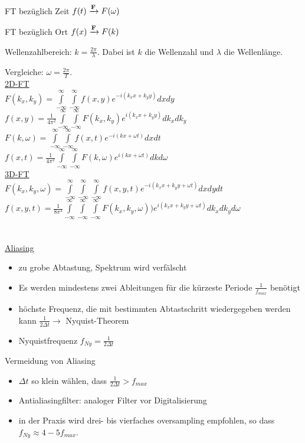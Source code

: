 FT bezüglich Zeit $f(t) \xrightarrow {\bf F} F(\omega)$

FT bezüglich Ort $f(x) \xrightarrow {\bf F} F(k)$

Wellenzahlbereich: $k=\frac{2\pi}{\lambda}$. Dabei ist $k$ die Wellenzahl und $\lambda$ die Wellenlänge. 

Vergleiche: $ \omega =\frac{2\pi}{T}$.
\\
\underline{2D-FT}\\
\hspace*{1cm}$F(k_x,k_y)=\int\limits_{-\infty}^\infty \int\limits_{-\infty}^\infty f(x,y)e^{-i(k_xx+k_yy)} dx dy$\\
\hspace*{1cm} $f(x,y)=\frac{1}{4\pi^2}\int\limits_{-\infty}^\infty \int\limits_{-\infty}^\infty F(k_x,k_y)e^{i(k_xx+k_yy)} dk_x dk_y$\\
\hspace*{1cm} $F(k,\omega)=\int\limits_{-\infty}^\infty \int\limits_{-\infty}^\infty f(x,t)e^{-i(kx+\omega t)} dx dt$\\
\hspace*{1cm} $f(x,t)=\frac{1}{4\pi^2}\int\limits_{-\infty}^\infty \int\limits_{-\infty}^\infty F(k,\omega)e^{i(kx+\omega t)} dk d\omega$\\
\underline{3D-FT}\\
\hspace*{1cm}$F(k_x,k_y,\omega)=\int\limits_{-\infty}^\infty \int\limits_{-\infty}^\infty \int\limits_{-\infty}^\infty f(x,y,t)e^{-i(k_xx+k_yy+\omega t)} dx dy dt$\\
\hspace*{1cm} $f(x,y,t)=\frac{1}{8\pi^3}\int\limits_{-\infty}^\infty \int\limits_{-\infty}^\infty \int\limits_{-\infty}^\infty F(k_x,k_y,\omega))e^{i(k_xx+k_yy+\omega t)} dk_x dk_y d\omega$\\
\\
\\
\underline{Aliasing}
\begin{itemize}
\item zu grobe Abtastung, Spektrum wird verfälscht
\item Es werden mindestens zwei Ableitungen für die kürzeste Periode $\frac{1}{f_{max}}$ benötigt
\item höchste Frequenz, die mit bestimmten Abtastschritt wiedergegeben werden kann $\frac{1}{2\Delta t} \rightarrow$ Nyquist-Theorem
\item Nyquistfrequenz $f_{Ny}=\frac{1}{2 \Delta t}$
\end {itemize}
Vermeidung von Aliasing
\begin{itemize}
\item $\Delta t$ so klein wählen, dass $\frac {1}{2\Delta t}>f_{max}$
\item Antialiasingfilter: analoger Filter vor Digitalisierung
\item in der Praxis wird drei- bis vierfaches oversampling empfohlen, so dass $f_{Ny}\approx 4-5 f_{max}$. 
\end {itemize}